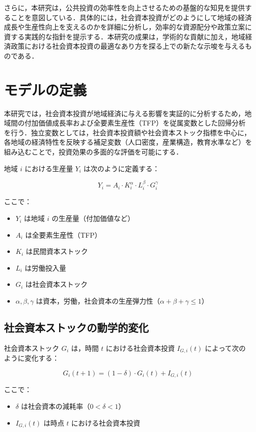 \documentclass[a4paper, 10.5pt, twocolumn, dvipdfmx]{jarticle}
\begin{document}
さらに，本研究は，公共投資の効率性を向上させるための基盤的な知見を提供することを意図している．具体的には，社会資本投資がどのようにして地域の経済成長や生産性向上を支えるのかを詳細に分析し，効率的な資源配分や政策立案に資する実践的な指針を提示する．本研究の成果は，学術的な貢献に加え，地域経済政策における社会資本投資の最適なあり方を探る上での新たな示唆を与えるものである．


\section{モデルの定義}
本研究では，社会資本投資が地域経済に与える影響を実証的に分析するため，地域間の付加価値成長率および全要素生産性（TFP）を従属変数とした回帰分析を行う．独立変数としては，社会資本投資額や社会資本ストック指標を中心に，各地域の経済特性を反映する補足変数（人口密度，産業構造，教育水準など）を組み込むことで，投資効果の多面的な評価を可能にする．


地域 \( i \) における生産量 \( Y_i \) は次のように定義する：

\[
	Y_i = A_i \cdot K_i^\alpha \cdot L_i^\beta \cdot G_i^\gamma
\]

ここで：
\begin{itemize}
	\renewcommand{\labelitemi}{}
	\item \( Y_i \) は地域 \( i \) の生産量（付加価値など）
	\item \( A_i \) は全要素生産性（TFP）
	\item \( K_i \) は民間資本ストック
	\item \( L_i \) は労働投入量
	\item \( G_i \) は社会資本ストック
	\item \( \alpha, \beta, \gamma \) は資本，労働，社会資本の生産弾力性（\( \alpha + \beta + \gamma \leq 1 \)）
\end{itemize}

\subsection{社会資本ストックの動学的変化}

社会資本ストック \( G_i \) は，時間 \( t \) における社会資本投資 \( I_{G,i}(t) \) によって次のように変化する：

\[
	G_i(t+1) = (1-\delta) \cdot G_i(t) + I_{G,i}(t)
\]

ここで：
\begin{itemize}
	\renewcommand{\labelitemi}{}
	\item \( \delta \) は社会資本の減耗率（\( 0 < \delta < 1 \)）
	\item \( I_{G,i}(t) \) は時点 \( t \) における社会資本投資
\end{itemize}
\end{document}
